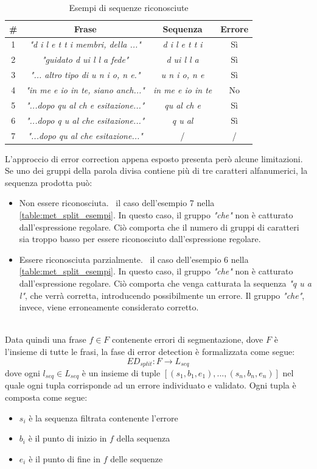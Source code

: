 \begin{table}[H]
	\centering
	\begin{tabular}{cccc}
	\textbf{\#} & \textbf{Frase} & \textbf{Sequenza} & \textbf{Errore} \\ \hline
	
	1 &\textit{"d i l e t t i membri, della ..."}	&	\textit{d i l e t t i}	&	Sì \\
	2 &\textit{"guidato d ui l l a fede"}			& 	\textit{d ui l l a}		&	Sì \\
	3 &\textit{"... altro tipo di u n i o, n e."}	&	\textit{u n i o, n e}	&	Sì \\
	4 &\textit{"in me e io in te, siano anch..."}	&	\textit{in me e io in te}&	No \\
	5 &\textit{"...dopo qu al ch e esitazione..."}	&	\textit{qu al ch e}&	Sì\\
	6 &\textit{"...dopo q u al che esitazione..."}	&	\textit{q u al}&	Sì\\
	7 &\textit{"...dopo qu al che esitazione..."}	&	/ &	/\\
	\end{tabular}
	\caption{Esempi di sequenze riconosciute}
	\label{table:met_split_esempi}
\end{table}
L'approccio di error correction appena esposto presenta però alcune limitazioni. Se uno dei gruppi della parola divisa contiene più di tre caratteri alfanumerici, la sequenza prodotta può:
\begin{itemize}
\item Non essere riconosciuta. \E\ il caso dell'esempio 7 nella \autoref{table:met_split_esempi}. In questo caso, il gruppo \textit{"che"} non è catturato dall'espressione regolare. Ciò comporta che il numero di gruppi di caratteri sia troppo basso per essere riconosciuto dall'espressione regolare.
\item Essere riconosciuta parzialmente.  \E\ il caso dell'esempio 6 nella \autoref{table:met_split_esempi}. In questo caso, il gruppo \textit{"che"} non è catturato dall'espressione regolare. Ciò comporta che venga catturata la sequenza \textit{"q u a l"}, che verrà corretta, introducendo possibilmente un errore. Il gruppo \textit{"che"}, invece, viene erroneamente considerato corretto.
\end{itemize}
\ \\
Data quindi una frase $f \in F$ contenente errori di segmentazione, dove $F$ è l'insieme di tutte le frasi, la fase di error detection è formalizzata come segue:
\begin{equation}
\textit{ED}_{split}: F \rightarrow L_{seq}
\end{equation}
dove ogni $l_{seq} \in L_{seq}$ è un insieme di tuple $[(s_1,b_1,e_1),...,(s_n,b_n,e_n)]$ nel quale ogni tupla corrisponde ad un errore individuato e validato. Ogni tupla è composta come segue:
\begin{itemize}
\item $s_i$ è la sequenza filtrata contenente l'errore
\item $b_i$ è il punto di inizio in $f$ della sequenza
\item $e_i$ è il punto di fine in $f$ delle sequenze
\end{itemize}

